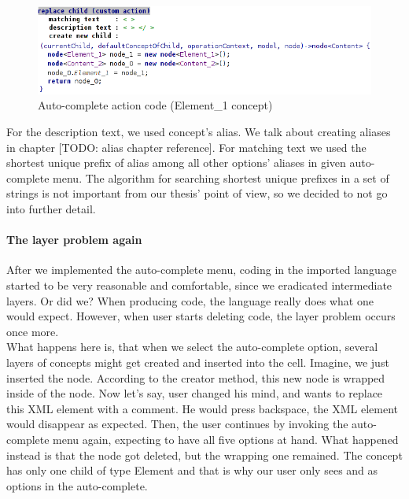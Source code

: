 \begin{figure}[h]
	\centering
	\includegraphics[width=\textwidth]{./img/autocomplete_action.png}
	\caption{Auto-complete action code (Element{\_}1 concept)}
	\label{fig:autocomplete_action}
\end{figure}

For the description text, we used concept's alias.
We talk about creating aliases in chapter [TODO: alias chapter reference].
For matching text we used the shortest unique prefix of alias among all other options' aliases in given auto-complete menu.
The algorithm for searching shortest unique prefixes in a set of strings is not important from our thesis' point of view, so we decided to not go into further detail.


\paragraph{The layer problem again}

After we implemented the auto-complete menu, coding in the imported language started to be very reasonable and comfortable, since we eradicated intermediate layers.
Or did we?
When producing code, the language really does what one would expect.
However, when user starts deleting code, the layer problem occurs once more.
\\

What happens here is, that when we select the auto-complete option, several layers of concepts might get created and inserted into the cell.
Imagine, we just inserted the  node.
According to the creator method, this new node is wrapped inside of the  node.
Now let's say, user changed his mind, and wants to replace this XML element with a comment.
He would press backspace, the XML element would disappear as expected.
Then, the user continues by invoking the auto-complete menu again, expecting to have all five options at hand.
What happened instead is that the  node got deleted, but the wrapping  one remained.
The  concept has only one child of type Element and that is why our user only sees  and  as options in the auto-complete.


